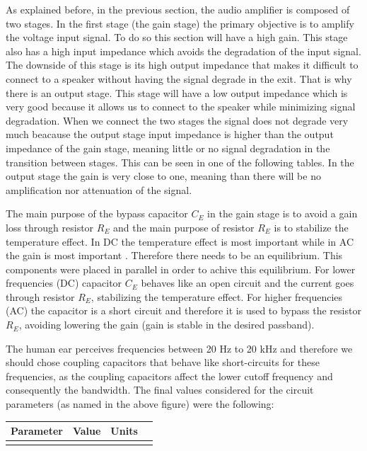 As explained before, in the previous section, the audio amplifier is composed of two stages. In the first stage (the gain stage) the primary objective is to amplify the voltage input signal. To do so this section will have a high gain. This stage also has a high input impedance which avoids the degradation of the input signal. The  downside of this stage is its high output impedance that makes it difficult to connect to a speaker without having the signal degrade in the exit. That is why there is an output stage. This stage will have a low output impedance which is very good because it allows us to connect to the speaker while minimizing signal degradation. When we connect the two stages the signal does not degrade very much beacause the output stage input impedance is higher than the output impedance of the gain stage, meaning little or no signal degradation in the transition between stages. This can be seen in one of the following tables. In the output stage the gain is very close to one, meaning than there will be no amplification nor attenuation of the signal.\par  

The main purpose of the bypass capacitor $C_{E}$ in the gain stage is to avoid a gain loss through resistor ${R_E}$ and the main purpose of resistor ${R_E}$ is to stabilize the temperature effect. In  DC the temperature effect is most important while in AC the gain is most important . Therefore there needs to be an equilibrium. This components were placed in parallel in order to achive this equilibrium. For lower frequencies (DC) capacitor $C_{E}$ behaves like an open circuit and the current goes through resistor ${R_E}$, stabilizing the temperature effect. For higher frequencies (AC) the capacitor is a short circuit and therefore it is used to bypass the resistor $R_{E}$, avoiding lowering the gain (gain is stable in the desired passband).\par


The human ear perceives frequencies between 20 Hz to 20 kHz and therefore we should chose coupling capacitors that behave like short-circuits for these frequencies, as the coupling capacitors affect the lower cutoff frequency and consequently the bandwidth. The final values considered for the circuit parameters (as named in the above figure) were the following:

\hfill
 \parbox{1\linewidth}{
  \centering
  \begin{tabular}{|l|l|l|r|}
    \hline    
    {\bf Parameter} & {\bf Value} & {\bf Units }\\ \hline
    
  \label{tab:params}
  \end{tabular}
  }
\par

